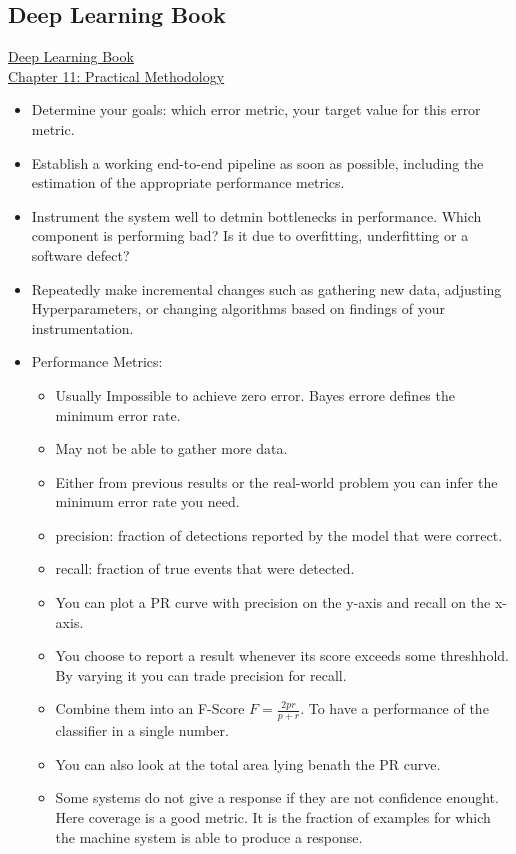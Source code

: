\subsection{Deep Learning Book}
\href{https://www.deeplearningbook.org/}{Deep Learning Book}\\
\href{https://www.youtube.com/watch?v=qaMdN6LS9rA}{Chapter 11: Practical Methodology}
\begin{itemize}[noitemsep,nolistsep]
	\item Determine your goals: which error metric, your target value for this error metric. 
	\item Establish a working end-to-end pipeline as soon as possible, including the estimation of the appropriate performance metrics.
	\item Instrument the system well to detmin bottlenecks in performance. Which component is performing bad? Is it due to overfitting, underfitting or a software defect?
	\item Repeatedly make incremental changes such as gathering new data, adjusting Hyperparameters, or changing algorithms based on findings of your instrumentation. 
	\item Performance Metrics:
	\begin{itemize}[noitemsep,nolistsep]
		\item Usually Impossible to achieve zero error. Bayes errore defines the minimum error rate.
		\item May not be able to gather more data.
		\item Either from previous results or the real-world problem you can infer the minimum error rate you need.
		\item precision: fraction of detections reported by the model that were correct.
		\item recall: fraction of true events that were detected.
		\item You can plot a PR curve with precision on the y-axis and recall on the x-axis.
		\item You choose to report a result whenever its score exceeds some threshhold. By varying it you can trade precision for recall.
		\item Combine them into an F-Score $F = \frac{2pr}{p+r}$. To have a performance of the classifier in a single number.
		\item You can also look at the total area lying benath the PR curve.
		\item Some systems do not give a response if they are not confidence enought. Here coverage is a good metric. It is the fraction of examples for which the machine system is able to produce a response.

\end{itemize}
\end{itemize}
